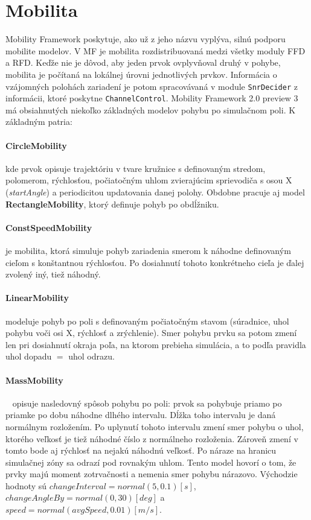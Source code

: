 \section{Mobilita}
\indent\indent Mobility Framework poskytuje, ako už z jeho názvu vyplýva, silnú podporu mobilite modelov. V MF je mobilita rozdistribuovaná medzi všetky moduly FFD a RFD. Keďže nie je dôvod, aby jeden prvok ovplyvňoval druhý v pohybe, mobilita je počítaná na lokálnej úrovni jednotlivých prvkov. Informácia o vzájomných polohách zariadení je potom spracovávaná v module \texttt{SnrDecider} z informácii, ktoré poskytne \texttt{ChannelControl}. Mobility Framework 2.0 preview 3 má obsiahnutých niekoľko základných modelov pohybu po simulačnom poli. K základným patria:\\
\paragraph{CircleMobility} kde prvok opisuje trajektóriu v tvare kružnice s definovaným stredom, polomerom, rýchlosťou, počiatočným uhlom zvierajúcim sprievodiča s osou X (\textit{startAngle}) a periodicitou updatovania danej polohy. Obdobne pracuje aj model \textbf{RectangleMobility}, ktorý definuje pohyb po obdĺžniku.
\paragraph{ConstSpeedMobility} je mobilita, ktorá simuluje pohyb zariadenia smerom k náhodne definovaným cieľom s konštantnou rýchlosťou. Po dosiahnutí tohoto konkrétneho cieľa je ďalej zvolený iný, tiež náhodný.
\paragraph{LinearMobility} modeluje pohyb po poli s definovaným počiatočným stavom (súradnice, uhol pohybu voči osi X, rýchlosť a zrýchlenie). Smer pohybu prvku sa potom zmení len pri dosiahnutí okraja poľa, na ktorom prebieha simulácia, a to podľa pravidla uhol dopadu $=$ uhol odrazu.
\paragraph{MassMobility}~\cite{massmobility99} opisuje nasledovný spôsob pohybu po poli: prvok sa pohybuje priamo po priamke po dobu náhodne dlhého intervalu. Dĺžka toho intervalu je daná normálnym rozložením. Po uplynutí tohoto intervalu zmení smer pohybu o uhol, ktorého veľkosť je tiež náhodné číslo z normálneho rozloženia. Zároveň zmení v tomto bode aj rýchlosť na nejakú náhodnú veľkosť. Po náraze na hranicu simulačnej zóny sa odrazí pod rovnakým uhlom. Tento model hovorí o tom, že prvky majú moment zotrvačnosti a nemenia smer pohybu nárazovo. Východzie hodnoty sú $changeInterval = normal(5, 0.1) [s]$, $changeAngleBy = normal(0, 30) [deg]$ a $speed = normal(avgSpeed, 0.01) [m/s]$.
